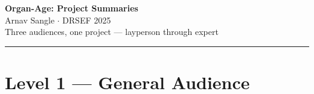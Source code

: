 \documentclass[11pt]{article}
\begin{document}
\begin{center}
  {\LARGE\bfseries Organ-Age: Project Summaries}\\[0.4em]
  {\large Arnav Sangle \quad $\cdot$ \quad DRSEF 2025}\\[0.2em]
  {\small Three audiences, one project --- layperson through expert}
\end{center}

\vspace{0.5em}
\noindent\rule{\linewidth}{1pt}
\vspace{0.3em}

\section{\textcolor{L1color}{Level 1 \textnormal{---} General Audience}}
\end{document}

